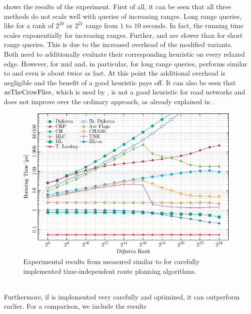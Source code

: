 	 shows the results of the experiment. First of all, it can be seen that all
	three methods do not scale well with queries of increasing ranges. Long range queries, like for a rank of $2^{20}$ or $2^{21}$ range
	from $1$ to $10$ seconds. In fact, the running time scales exponentially for increasing ranges. Further, \astar and \alt are slower
	than \dijkstra for short range queries. This is due to the increased overhead of the modified \dijkstra variants. Both need to
	additionally evaluate their corresponding heuristic on every relaxed edge. However, for mid and, in particular, for long
	range queries, \astar performs similar to \dijkstra and \alt even is about twice as fast. At this point the additional overhead is
	negligible and the benefit of a good heuristic pays off. It can also be seen that $\operatorname{asTheCrowFlies}$, which is used by \astar, is not a good
	heuristic for road networks and does not improve over the ordinary \dijkstra approach, as already explained in .\\
	\begin{figure}[!ht]
		 \begin{center}
			\includegraphics[scale=0.75]{res/uniModalTimeIndependentResultsExternal}
		\end{center}
		\caption{Experimental results from  measured similar to 
			for carefully implemented \uniModal time-independent route planning algorithms.}
		\label{uniModalTimeIndependentResultsExternal}
	\end{figure}\quad\\
	Furthermore, if \alt is implemented very carefully and optimized, it can outperform \dijkstra earlier. For a comparison, we include the results
